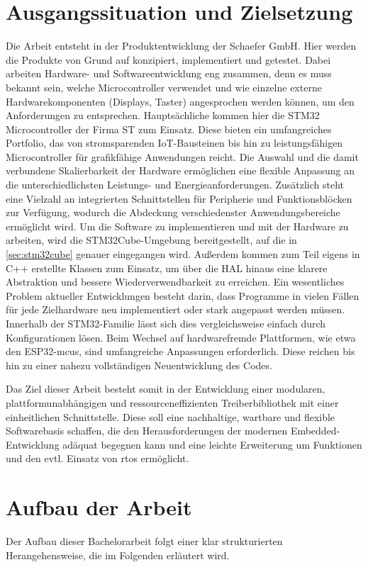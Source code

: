 \section{Ausgangssituation und Zielsetzung}
Die Arbeit entsteht in der Produktentwicklung der Schaefer GmbH.
Hier werden die Produkte von Grund auf konzipiert, implementiert und getestet.
Dabei arbeiten Hardware- und Softwareentwicklung eng zusammen, denn es muss bekannt sein, welche Microcontroller verwendet und wie einzelne externe Hardwarekomponenten (Displays, Taster) angesprochen werden können, um den Anforderungen zu entsprechen.
Hauptsächliche kommen hier die STM32 Microcontroller der Firma ST \cite{stm32_highperf} zum Einsatz.
Diese bieten ein umfangreiches Portfolio, das von stromsparenden IoT-Bausteinen bis hin zu leistungsfähigen Microcontroller für grafikfähige Anwendungen reicht.
Die Auswahl und die damit verbundene Skalierbarkeit der Hardware ermöglichen eine flexible Anpassung an die unterschiedlichsten Leistungs- und Energieanforderungen.
Zusätzlich steht eine Vielzahl an integrierten Schnittstellen für Peripherie und Funktionsblöcken zur Verfügung, wodurch die Abdeckung verschiedenster Anwendungsbereiche ermöglicht wird.
Um die Software zu implementieren und mit der Hardware zu arbeiten, wird die STM32Cube-Umgebung bereitgestellt, auf die in \cref{sec:stm32cube} genauer eingegangen wird.
Außerdem kommen zum Teil eigens in C++ erstellte Klassen zum Einsatz, um über die HAL hinaus eine klarere Abstraktion und bessere Wiederverwendbarkeit zu erreichen.
Ein wesentliches Problem aktueller Entwicklungen besteht darin, dass Programme in vielen Fällen für jede Zielhardware neu implementiert oder stark angepasst werden müssen.
Innerhalb der STM32-Familie lässt sich dies vergleichsweise einfach durch Konfigurationen lösen. 
Beim Wechsel auf hardwarefremde Plattformen, wie etwa den ESP32-\gls{mcu}s, sind umfangreiche Anpassungen erforderlich. 
Diese reichen bis hin zu einer nahezu vollständigen Neuentwicklung des Codes.

Das Ziel dieser Arbeit besteht somit in der Entwicklung einer modularen, plattformunabhängigen und ressourceneffizienten Treiberbibliothek mit einer einheitlichen Schnittstelle. 
Diese soll eine nachhaltige, wartbare und flexible Softwarebasis schaffen, die den Herausforderungen der modernen Embedded-Entwicklung adäquat begegnen kann und eine  leichte Erweiterung um Funktionen und den evtl. Einsatz von \gls{rtos} ermöglicht.


\section{Aufbau der Arbeit}
Der Aufbau dieser Bachelorarbeit folgt einer klar strukturierten Herangehensweise, die im Folgenden erläutert wird. 

